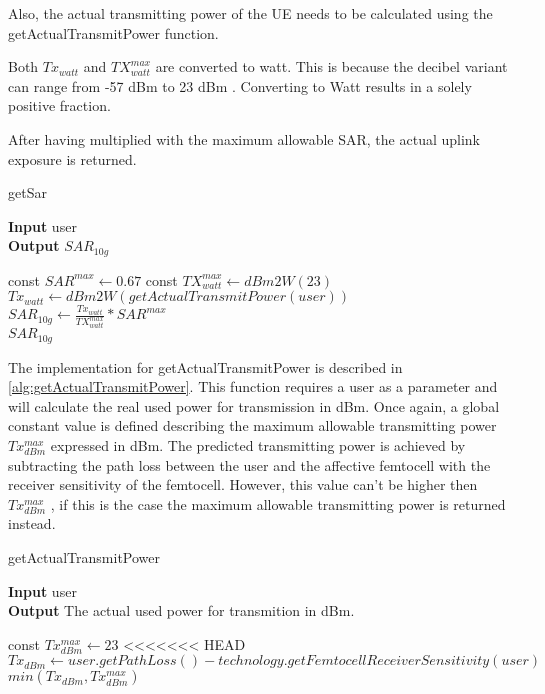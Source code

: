 Also, the actual transmitting power of the \gls{UE} needs to be calculated using the getActualTransmitPower function. 

Both $Tx_{watt}$ and $TX^{max}_{watt}$ are converted to watt. This is because the decibel variant can range from -57 dBm to 23 dBm \cite{J10_RDPgit}. Converting to Watt results in a solely positive fraction. 

After having multiplied with the maximum allowable \gls{SAR}, the actual uplink exposure is returned.

\begin{algorithm}
	\caption{getSar} 
	\label{alg:getsar}
     \hspace*{\algorithmicindent} \textbf{Input} user \\
     \hspace*{\algorithmicindent} \textbf{Output} $SAR_{10g}$
	\begin{algorithmic}[1]
		\State  const $SAR^{max} \gets 0.67$
		\State  const $TX^{max}_{watt} \gets dBm2W(23)$
		\vspace{4 mm}
		\State $Tx_{watt} \gets dBm2W(getActualTransmitPower(user)) $		
		\State $ SAR_{10g} \gets \frac{Tx_{watt}}{TX^{max}_{watt}} * SAR^{max}$ \\
		\Return $ SAR_{10g}$
	\end{algorithmic} 
\end{algorithm}


The implementation for getActualTransmitPower is described in \ref{alg:getActualTransmitPower}. This function requires a user as a parameter and will calculate the real used power for transmission in dBm.
Once again, a global constant value is defined describing the maximum allowable transmitting power $Tx^{max}_{dBm}$ expressed in dBm. The predicted transmitting power is achieved by subtracting the path loss between the user and the affective femtocell with the receiver sensitivity of the femtocell. However, this value can't be higher then  $Tx^{max}_{dBm}$ , if this is the case the maximum allowable transmitting power is returned instead.

\begin{algorithm}
	\caption{getActualTransmitPower} 
	\label{alg:getActualTransmitPowergit}
     \hspace*{\algorithmicindent} \textbf{Input} user \\
     \hspace*{\algorithmicindent} \textbf{Output} The actual used power for transmition in dBm.
	\begin{algorithmic}[1]
		\State const $Tx^{max}_{dBm} \gets 23$
		\vspace{4 mm}
<<<<<<< HEAD
		\State $ Tx_{dBm} \gets user.getPathLoss() -  technology.getFemtocellReceiverSensitivity(user)$ \\
		\Return $min(Tx_{dBm}, Tx^{max}_{dBm})$ 
	\end{algorithmic} 
\end{algorithm}



